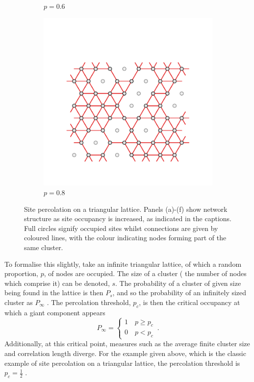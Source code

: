 \begin{figure}[bt]
\begin{subfigure}[b]{0.3\textwidth}
         \caption{$p=0.6$}
         \label{fig:perctri6}
     \end{subfigure}
     \hfill
      \begin{subfigure}[b]{0.3\textwidth}
         \centering
         \includegraphics[width=\textwidth]{./figures/targeted_opt/perc_tri_8.pdf}
         \caption{$p=0.8$}
         \label{fig:perctri8}
     \end{subfigure}
     \hfill
     
     \caption{Site percolation on a triangular lattice. Panels (a)\--(f) show network structure as site occupancy is increased, as indicated in the captions. Full circles signify occupied sites whilst connections are given by coloured lines, with the colour indicating nodes forming part of the same cluster.}
     \label{fig:perctri}
\end{figure}

To formalise this slightly, take an infinite triangular lattice, of which a random proportion, $p$, of nodes are occupied.
The size of a cluster (\ie{} the number of nodes which comprise it) can be denoted, $s$. 
The probability of a cluster of given size being found in the lattice is then $P_s$, and so the probability of an infinitely sized cluster as $P_{\infty}$ \cite{StaufferDietrich2014}.
The percolation threshold, $p_c$, is then the critical occupancy at which a giant component appears \ie{}
\begin{equation}
	P_{\infty}=\begin{cases} 1 \quad p\geq p_c \\
							0 \quad p<p_c
	\end{cases}\,.
\end{equation}
Additionally, at this critical point, measures such as the average finite cluster size and correlation length diverge.
For the example given above, which is the classic example of site percolation on a triangular lattice, the percolation threshold is $p_c=\frac{1}{2}$  \cite{Sykes1964}.

